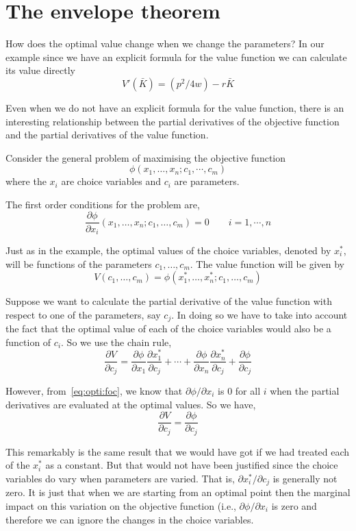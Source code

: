 \documentclass[11pt,reqno,openany]{amsbook}
\theoremstyle{plain}
\theoremstyle{definition}
\begin{document}
\section{The envelope theorem}
How does the optimal value change when we change the parameters? In
our example since we have an explicit formula for the value function
we can calculate its value directly
\[V'(\bar K) =(p^2/4w)-r\bar K\]

Even when we do not have an explicit formula for the value function,
there is an interesting relationship between the partial derivatives
of the objective function and the partial derivatives of the value
function.

Consider the general problem of maximising the objective function
\[\phi(x_1,\ldots,x_n;c_1,\cdots,c_m)\]
where the $x_i$ are choice variables and $c_i$ are parameters.

The first order conditions for the problem are,
\begin{equation}\label{eq:opti:foc}
\frac{\partial \phi}{\partial
  x_i}(x_1,\ldots,x_n;c_1,\ldots,c_m)=0\qquad i=1,\cdots,n
\end{equation}

Just as in the example, the optimal values of the choice variables,
denoted by $x_i^*$, will be functions of the parameters
$c_1,\ldots,c_m$. The value function will be given by
\[V(c_1,\ldots,c_m)=\phi(x_1^*,\ldots,x_n^*;c_1,\ldots,c_m)\]

Suppose we want to calculate the partial derivative of the value
function with respect to one of the parameters, say $c_j$. In doing so
we have to take into account the fact that the optimal value of each
of the choice variables would also be a function of $c_i$. So we use the
chain rule,
\[\frac{\partial V}{\partial c_j}=
\frac{\partial \phi}{\partial x_1}\frac{\partial x_1^*}{\partial c_j}
+\cdots
+\frac{\partial \phi}{\partial x_n}\frac{\partial x_n^*}{\partial c_j}
+\frac{\partial \phi}{\partial c_j}
\]

However, from~\eqref{eq:opti:foc}, we know that $\partial
\phi/\partial x_i$ is $0$ for all $i$ when the partial derivatives are
evaluated at the optimal values. So we have,
\begin{equation}\label{eq:opti:envelope}
\frac{\partial V}{\partial c_j}=\frac{\partial \phi}{\partial c_j}
\end{equation}

This remarkably is the same result that we would have got if we had
treated each of the $x_i^*$ as a constant. But that would not have
been justified since the choice variables do vary when parameters are
varied. That is, $\partial x_i^*/\partial c_j$ is generally not zero.
It is just that when we are starting from an optimal point then the
marginal impact on this variation on the objective function (i.e.,
$\partial \phi/\partial x_i$ is zero and therefore we can ignore the
changes in the choice variables.
\end{document}
